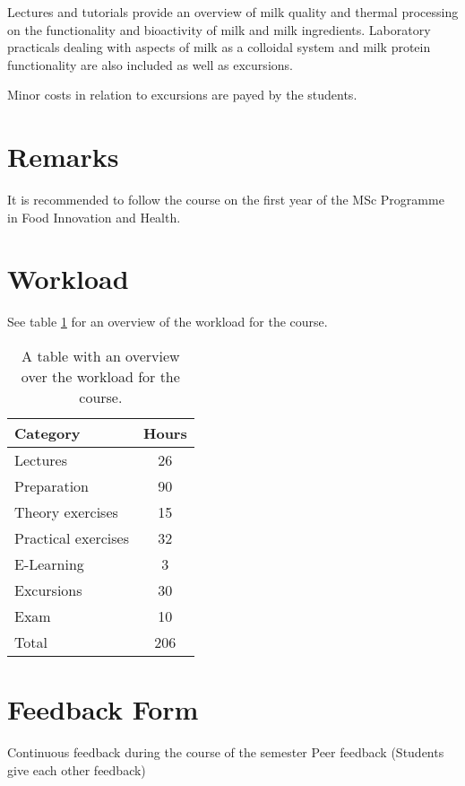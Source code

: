 Lectures and tutorials provide an overview of milk quality and thermal processing on the functionality and bioactivity of milk and milk ingredients. Laboratory practicals dealing with aspects of milk as a colloidal system and milk protein functionality are also included as well as excursions.

Minor costs in relation to excursions are payed by the students.

\section{Remarks}
It is recommended to follow the course on the first year of the MSc Programme in Food Innovation and Health.

\section{Workload}
See table \ref{tab:workload} for an overview of the workload for the course.
\begin{table}
    \centering
    \caption{A table with an overview over the workload for the course.}
    \label{tab:workload}
    \begin{tabular}{ l | c}
        \textbf{Category} & \textbf{Hours} \\ 
        \hline
        Lectures & 26 \\ 

        Preparation & 90 \\

        Theory exercises & 15 \\ 

        Practical exercises & 32 \\
        
        E-Learning & 3 \\

        Excursions & 30 \\

        Exam & 10 \\ 
        \hline
        Total & 206 \\ 
    \end{tabular}
\end{table}

\section{Feedback Form}
Continuous feedback during the course of the semester
Peer feedback (Students give each other feedback)

